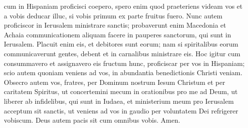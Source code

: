\begin{biblechapter}
\begin{biblechapter}
\begin{biblechapter}
\begin{biblechapter}
\begin{biblechapter}
\begin{biblechapter}
\begin{biblechapter}
\begin{biblechapter}
\begin{biblechapter}
\begin{biblechapter}
\begin{biblechapter}
\begin{biblechapter}
\begin{biblechapter}
\begin{biblechapter}
\begin{biblechapter}
\verse cum in Hispaniam proficisci coepero, spero enim quod praeteriens videam vos et a vobis deducar illuc, si vobis primum ex parte fruitus fuero.
 \verse Nunc autem proficiscor in Ierusalem ministrare sanctis; 
\verse probaverunt enim Macedonia et Achaia communicationem aliquam facere in pauperes sanctorum, qui sunt in Ierusalem. 
\verse Placuit enim eis, et debitores sunt eorum; nam si spiritalibus eorum communicaverunt gentes, debent et in carnalibus ministrare eis. 
\verse Hoc igitur cum consummavero et assignavero eis fructum hunc, proficiscar per vos in Hispaniam; 
\verse scio autem quoniam veniens ad vos, in abundantia benedictionis Christi veniam. 
\verse Obsecro autem vos, fratres, per Dominum nostrum Iesum Christum et per caritatem Spiritus, ut concertemini mecum in orationibus pro me ad Deum, 
\verse ut liberer ab infidelibus, qui sunt in Iudaea, et ministerium meum pro Ierusalem acceptum sit sanctis, 
\verse ut veniens ad vos in gaudio per voluntatem Dei refrigerer vobiscum. 
\verse Deus autem pacis sit cum omnibus vobis. Amen.
 

\end{biblechapter}
\end{biblechapter}
\end{biblechapter}
\end{biblechapter}
\end{biblechapter}
\end{biblechapter}
\end{biblechapter}
\end{biblechapter}
\end{biblechapter}
\end{biblechapter}
\end{biblechapter}
\end{biblechapter}
\end{biblechapter}
\end{biblechapter}
\end{biblechapter}
